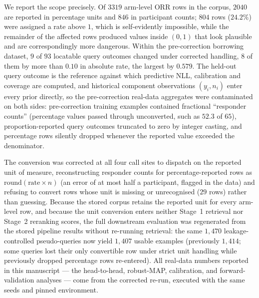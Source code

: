 \documentclass[11pt]{article}
\begin{document}
We report the scope precisely. Of $3319$ arm-level ORR rows in the corpus,
$2040$ are reported in percentage units and $846$ in participant counts; $804$
rows ($24.2\%$) were assigned a rate above $1$, which is self-evidently
impossible, while the remainder of the affected rows produced values inside
$(0,1)$ that look plausible and are correspondingly more dangerous. Within the
pre-correction borrowing dataset, $9$ of $93$ locatable query outcomes changed
under corrected handling, $8$ of them by more than $0.10$ in absolute rate, the
largest by $0.579$. The
held-out query outcome is the reference against which predictive NLL,
calibration and coverage are computed, and historical component observations
$(y_i, n_i)$ enter every prior directly, so the pre-correction real-data
aggregates were contaminated on both sides: pre-correction training examples
contained fractional ``responder counts'' (percentage values passed through
unconverted, such as $52.3$ of $65$), proportion-reported query outcomes
truncated to zero by integer casting, and percentage rows silently dropped
whenever the reported value exceeded the denominator.

The conversion was corrected at all four call sites to dispatch on the
reported unit of measure, reconstructing responder counts for
percentage-reported rows as $\mathrm{round}(\text{rate} \times n)$ (an error of
at most half a participant, flagged in the data) and refusing to convert rows
whose unit is missing or unrecognised ($29$ rows) rather than guessing. Because
the stored corpus retains the reported unit for every arm-level row, and
because the unit conversion enters neither Stage~1 retrieval nor Stage~2
reranking scores, the full downstream evaluation was regenerated from the
stored pipeline results without re-running retrieval: the same $1{,}470$
leakage-controlled pseudo-queries now yield $1{,}407$ usable examples
(previously $1{,}414$; some queries lost their only convertible row under
strict unit handling while previously dropped percentage rows re-entered). All
real-data numbers reported in this manuscript --- the head-to-head, robust-MAP,
calibration, and forward-validation analyses --- come from the corrected
re-run, executed with the same seeds and pinned environment.
\end{document}
